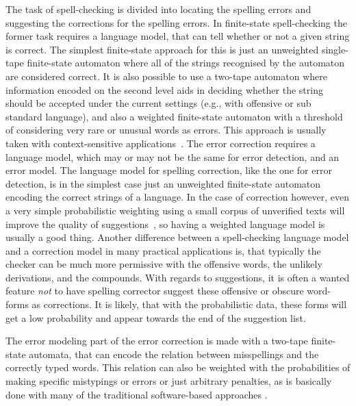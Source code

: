 \documentclass[a4paper,12pt]{article}
\begin{document}
The task of spell-checking is divided into locating the spelling errors and
suggesting the corrections for the spelling errors. In finite-state
spell-checking the former task requires a language model, that can tell whether
or not a given string is correct. The simplest finite-state approach for this
is just an unweighted single-tape finite-state automaton where all of the
strings recognised by the automaton are considered correct. It is also possible
to use a two-tape automaton where information encoded on the second level aids
in deciding whether the string should be accepted under the current settings
(e.g.,  with offensive or sub standard language), and also a weighted
finite-state automaton with a threshold of considering very rare or unusual
words as errors.  This approach is usually taken with context-sensitive
applications~\cite[]{otero/2007}. The error correction requires a language
model, which may or may not be the same for error detection, and an error
model.  The language model for spelling correction, like the one for error
detection, is in the simplest case just an unweighted finite-state automaton
encoding the correct strings of a language. In the case of correction however,
even a very simple probabilistic weighting using a small corpus of unverified
texts will improve the quality of suggestions~\cite[]{pirinen/2010/lrec}, so
having a weighted language model is usually a good thing. Another difference
between a spell-checking language model and a correction model in many
practical applications is, that typically the checker can be much more
permissive with the offensive words, the unlikely derivations, and the
compounds. With regards to suggestions, it is often a wanted feature \emph{not}
to have spelling corrector suggest these offensive or obscure word-forms as
corrections. It is likely, that with the probabilistic data, these forms will
get a low probability and appear towards the end of the suggestion list. 

The error modeling part of the error correction is made with a two-tape
finite-state automata, that can encode the relation between misspellings and
the correctly typed words. This relation can also be weighted with the
probabilities of making specific mistypings or errors or just arbitrary
penalties, as is basically done with many of the traditional software-based
approaches \cite[such as][]{Hunspell/manual}.
\end{document}
